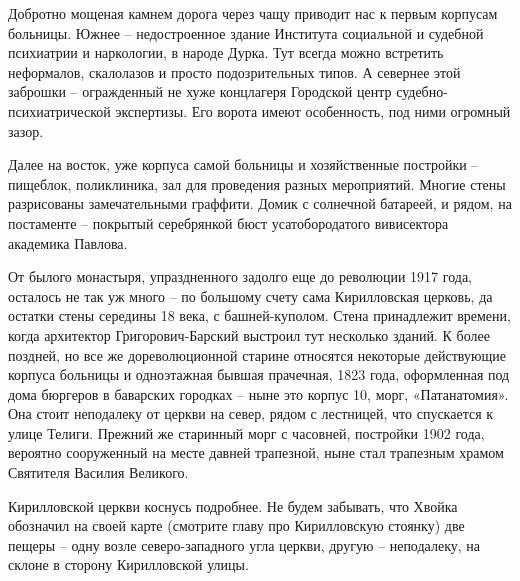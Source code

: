Добротно мощеная камнем дорога через чащу приводит нас к первым корпусам больницы. Южнее – недостроенное здание Института социальной и судебной психиатрии и наркологии, в народе Дурка. Тут всегда можно встретить неформалов, скалолазов и просто подозрительных типов. А севернее этой заброшки – огражденный не хуже концлагеря Городской центр судебно-психиатри\-ческой экспертизы. Его ворота имеют особенность, под ними огромный зазор.

Далее на восток, уже корпуса самой больницы и хозяйственные постройки – пищеблок, поликлиника, зал для проведения разных мероприятий. Многие стены разрисованы замечательными граффити. Домик с солнечной батареей, и рядом, на постаменте – покрытый серебрянкой бюст усатобородатого вивисектора академика Павлова. 


От былого монастыря, упраздненного задолго еще до революции 1917 года, осталось не так уж много – по большому счету сама Кирилловская церковь, да остатки стены середины 18 века, с башней-куполом. Стена принадлежит времени, когда архитектор Григорович-Барский выстроил тут несколько зданий. К более поздней, но все же дореволюционной старине относятся некоторые действующие корпуса больницы и одноэтажная бывшая прачечная, 1823 года, оформленная под дома бюргеров в баварских городках – ныне это корпус 10, морг, «Патанатомия». Она стоит неподалеку от церкви на север, рядом с лестницей, что спускается к улице Телиги. Прежний же старинный морг с часовней, постройки 1902 года, вероятно сооруженный на месте давней трапезной, ныне стал трапезным храмом Святителя Василия Великого.


Кирилловской церкви коснусь подробнее. Не будем забывать, что Хвойка обозначил на своей карте (смотрите главу про Кирилловскую стоянку) две пещеры – одну возле северо-западного угла церкви, другую – неподалеку, на склоне в сторону Кирилловской улицы.


